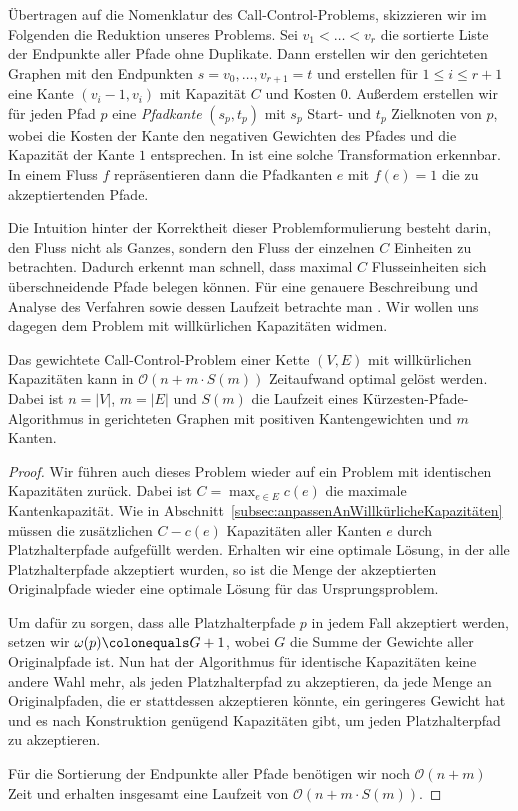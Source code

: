 Übertragen auf die Nomenklatur des Call-Control-Problems, skizzieren wir im Folgenden die Reduktion unseres Problems.
Sei $v_1 < \dots < v_r$ die sortierte Liste der Endpunkte aller Pfade ohne Duplikate.
Dann erstellen wir den gerichteten Graphen mit den Endpunkten $s = v_0, \dots, v_{r+1}=t$ und erstellen
für $1 \leq i \leq r+1$ eine Kante $(v_i-1, v_i)$ mit Kapazität $C$ und Kosten $0$.
Außerdem erstellen wir für jeden Pfad $p$ eine {\em Pfadkante} $(s_p, t_p)$ mit $s_p$ Start- und $t_p$ Zielknoten von $p$,
wobei die Kosten der Kante den negativen Gewichten des Pfades und die Kapazität der Kante $1$ entsprechen.
In  ist eine solche Transformation erkennbar.
In einem Fluss $f$ repräsentieren dann die Pfadkanten $e$ mit $f(e)=1$ die zu akzeptiertenden Pfade.

Die Intuition hinter der Korrektheit dieser Problemformulierung besteht darin, den Fluss nicht als Ganzes, sondern
den Fluss der einzelnen $C$ Einheiten zu betrachten.
Dadurch erkennt man schnell, dass maximal $C$ Flusseinheiten sich überschneidende Pfade belegen können.
Für eine genauere Beschreibung und Analyse des Verfahren sowie dessen Laufzeit betrachte man .
Wir wollen uns dagegen dem Problem mit willkürlichen Kapazitäten widmen.

\begin{theorem}
    Das gewichtete Call-Control-Problem einer Kette $(V, E)$ mit willkürlichen Kapazitäten kann in $\mathcal O(n + m\cdot S(m))$
    Zeitaufwand optimal gelöst werden.
    Dabei ist $n = |V|$, $m=|E|$ und $S(m)$ die Laufzeit eines Kürzesten-Pfade-Algorithmus in gerichteten Graphen mit
    positiven Kantengewichten und $m$ Kanten.
\end{theorem}
\begin{proof}
    Wir führen auch dieses Problem wieder auf ein Problem mit identischen Kapazitäten zurück.
    Dabei ist $C = \max_{e \in E}c(e)$ die maximale Kantenkapazität.
    Wie in Abschnitt~\ref{subsec:anpassenAnWillkürlicheKapazitäten} müssen die zusätzlichen $C - c(e)$ Kapazitäten
    aller Kanten $e$ durch Platzhalterpfade aufgefüllt werden.
    Erhalten wir eine optimale Lösung, in der alle Platzhalterpfade akzeptiert wurden, so ist die Menge der akzeptierten
    Originalpfade wieder eine optimale Lösung für das Ursprungsproblem.

    Um dafür zu sorgen, dass alle Platzhalterpfade $p$ in jedem Fall akzeptiert werden, setzen wir
    $\omega(p) \colonequals G + 1$, wobei $G$ die Summe der Gewichte aller Originalpfade ist.
    Nun hat der Algorithmus für identische Kapazitäten keine andere Wahl mehr, als jeden Platzhalterpfad zu akzeptieren,
    da jede Menge an Originalpfaden, die er stattdessen akzeptieren könnte, ein geringeres Gewicht hat und es nach
    Konstruktion genügend Kapazitäten gibt, um jeden Platzhalterpfad zu akzeptieren.

    Für die Sortierung der Endpunkte aller Pfade benötigen wir noch $\mathcal O(n+m)$ Zeit und erhalten insgesamt eine Laufzeit
    von $\mathcal O(n+m\cdot S(m))$.
\end{proof}

